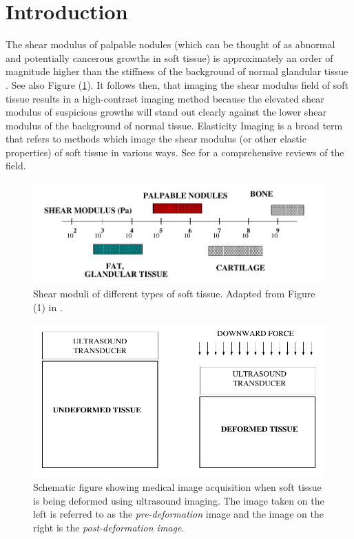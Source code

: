 \documentclass[12pt]{article}
\begin{document}
\section{Introduction}
The shear modulus of palpable nodules (which can be thought of as abnormal and potentially cancerous growths in soft tissue) is approximately an order of magnitude higher than the stiffness of the background of normal glandular tissue \cite{paper:sarv1998}. See also Figure (\ref{fig:shearmod}). It follows then, that imaging the shear modulus field of soft tissue results in a high-contrast imaging method because the elevated shear modulus of suspicious growths will stand out clearly against the lower shear modulus of the background of normal tissue. Elasticity Imaging is a broad term that refers to methods which image the shear modulus (or other elastic properties) of soft tissue in various ways. See \cite{paper:gao1996,paper:parker2010,book:alamgarra2019,bookchap:oberaibarbone2019} for a comprehensive reviews of the field.
%
\begin{figure}[h]
   \centering
    \includegraphics[totalheight=3cm]{Figures/shearmod.png}
  \caption{\label{fig:shearmod} Shear moduli of different types of soft tissue. Adapted from Figure (1) in \cite{paper:sarv1998}.}
\end{figure}
%
\begin{figure}[h]
   \centering
    \includegraphics[totalheight=5cm]{Figures/prepostimage.png}
  \caption{\label{fig:prepostimage} Schematic figure showing medical image acquisition when soft tissue is being deformed using ultrasound imaging. The image taken on the left is referred to as the \textit{pre-deformation} image and the image on the right is the \textit{post-deformation image}.}
\end{figure}
%
\end{document}
